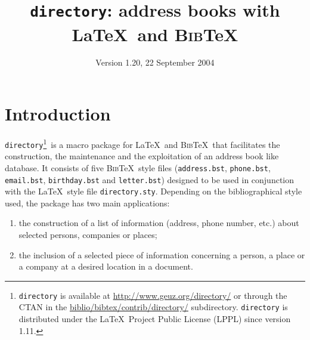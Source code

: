 \documentclass[10pt]{article}
\newcommand{\BibTeX}{\textsc{Bib}\TeX}
\newcommand{\Download}{\footnote{\texttt{directory} is available at
  \url{http://www.geuz.org/directory/} or through the CTAN in the
  \url{biblio/bibtex/contrib/directory/} subdirectory. \texttt{directory}
  is distributed under the \LaTeX\ Project Public License (LPPL) since
  version 1.11.}}
\begin{document}
\title{\texttt{directory}: address books with \LaTeX\ and \BibTeX}

\author{}


\date{Version 1.20, 22 September 2004}

\maketitle


\tableofcontents

\section{Introduction}

\texttt{directory}\Download\ is a macro package for \LaTeX\ and \BibTeX\ that
facilitates the construction, the maintenance and the exploitation of an
address book like database. It consists of five \BibTeX\ style files
(\texttt{address.bst}, \texttt{phone.bst}, \texttt{email.bst},
\texttt{birthday.bst} and \texttt{letter.bst}) designed to be used in
conjunction with the \LaTeX\ style file \texttt{directory.sty}. Depending on
the bibliographical style used, the package has two main applications:

\begin{enumerate}
\item
the construction of a list of information (address, phone number, etc.)
about selected persons, companies or places;
\item
the inclusion of a selected piece of information concerning a person, a
place or a company at a desired location in a document.
\end{enumerate}
\end{document}
